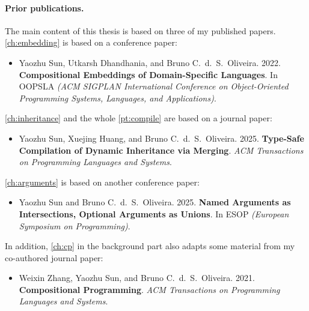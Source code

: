 \paragraph{Prior publications.}
The main content of this thesis is based on three of my published papers.
\autoref{ch:embedding} is based on a conference paper:
\begin{itemize}
\item Yaozhu Sun, Utkarsh Dhandhania, and Bruno C.~d.~S.~Oliveira. 2022.
\textbf{Compositional Embeddings of Domain-Specific Languages}. In OOPSLA
\textit{(ACM SIGPLAN International Conference on Object-Oriented Programming
Systems, Languages, and Applications)}.
\end{itemize}
\autoref{ch:inheritance} and the whole \autoref{pt:compile} are based on a
journal paper:
\begin{itemize}
\item Yaozhu Sun, Xuejing Huang, and Bruno C.~d.~S.~Oliveira. 2025.
\textbf{Type-Safe Compilation of Dynamic Inheritance via Merging}.
\textit{ACM Transactions on Programming Languages and Systems}.
\end{itemize}
\autoref{ch:arguments} is based on another conference paper:
\begin{itemize}
\item Yaozhu Sun and Bruno C.~d.~S.~Oliveira. 2025.
\textbf{Named Arguments as Intersections, Optional Arguments as Unions}.
In ESOP \textit{(European Symposium on Programming)}.
\end{itemize}
In addition, \autoref{ch:cp} in the background part also adapts some material
from my co-authored journal paper:
\begin{itemize}
\item Weixin Zhang, Yaozhu Sun, and Bruno C.~d.~S.~Oliveira. 2021.
\textbf{Compositional Programming}. \textit{ACM Transactions on Programming
Languages and Systems}.
\end{itemize}
